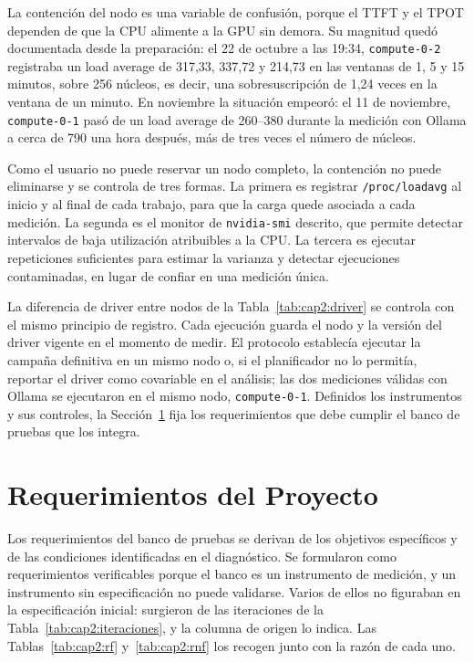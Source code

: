 La contención del nodo es una variable de confusión, porque el TTFT y el TPOT dependen de que la CPU alimente a la GPU sin demora. Su magnitud quedó documentada desde la preparación: el 22 de octubre a las 19:34, \texttt{compute-0-2} registraba un load average de 317,33, 337,72 y 214,73 en las ventanas de 1, 5 y 15 minutos, sobre 256 núcleos, es decir, una sobresuscripción de 1,24 veces en la ventana de un minuto. En noviembre la situación empeoró: el 11 de noviembre, \texttt{compute-0-1} pasó de un load average de 260--380 durante la medición con Ollama a cerca de 790 una hora después, más de tres veces el número de núcleos.

Como el usuario no puede reservar un nodo completo, la contención no puede eliminarse y se controla de tres formas. La primera es registrar \texttt{/proc/loadavg} al inicio y al final de cada trabajo, para que la carga quede asociada a cada medición. La segunda es el monitor de \texttt{nvidia-smi} descrito, que permite detectar intervalos de baja utilización atribuibles a la CPU. La tercera es ejecutar repeticiones suficientes para estimar la varianza y detectar ejecuciones contaminadas, en lugar de confiar en una medición única.

La diferencia de driver entre nodos de la Tabla~\ref{tab:cap2:driver} se controla con el mismo principio de registro. Cada ejecución guarda el nodo y la versión del driver vigente en el momento de medir. El protocolo establecía ejecutar la campaña definitiva en un mismo nodo o, si el planificador no lo permitía, reportar el driver como covariable en el análisis; las dos mediciones válidas con Ollama se ejecutaron en el mismo nodo, \texttt{compute-0-1}. Definidos los instrumentos y sus controles, la Sección~\ref{sec:cap2:requerimientos} fija los requerimientos que debe cumplir el banco de pruebas que los integra.

\section{Requerimientos del Proyecto}
\label{sec:cap2:requerimientos}

Los requerimientos del banco de pruebas se derivan de los objetivos específicos y de las condiciones identificadas en el diagnóstico. Se formularon como requerimientos verificables porque el banco es un instrumento de medición, y un instrumento sin especificación no puede validarse. Varios de ellos no figuraban en la especificación inicial: surgieron de las iteraciones de la Tabla~\ref{tab:cap2:iteraciones}, y la columna de origen lo indica. Las Tablas~\ref{tab:cap2:rf} y~\ref{tab:cap2:rnf} los recogen junto con la razón de cada uno.

